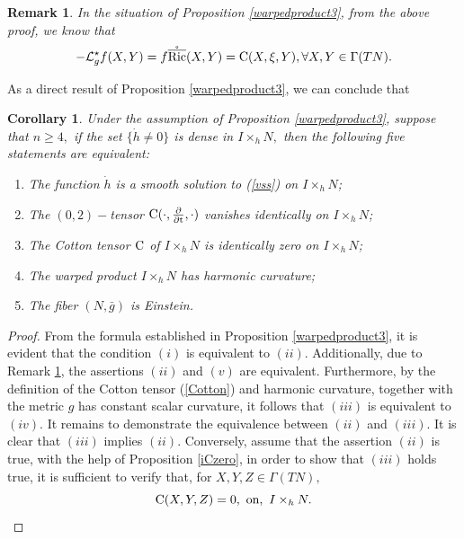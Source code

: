 \documentclass[10pt,leqno,oneside]{amsart}
\newtheorem{Cor}{Corollary}
\newtheorem{Rmk}{Remark}
\begin{document}
{    \begin{Rmk}\label{CXYN}
         In the situation of Proposition {\rm\ref{warpedproduct3}}, from the above proof, we know that
         \[-\mathcal{L}_g^{\star}f(X,Y)=f\mathring{\overline{{\rm{Ric}}}}(X,Y)={\rm{C}}(X,\xi,Y), \forall X,Y\in\Gamma(TN ).\]
    \end{Rmk}

         As a direct result of Proposition \ref{warpedproduct3}, we can conclude that

    \begin{Cor} \label{WPVSS}
         Under the assumption of Proposition {\rm\ref{warpedproduct3}}, suppose that $n\geq4,$ if the set $\{\dot{h}\neq0\}$ is dense in $I\times_hN,$ then the following five statements are equivalent:
        \begin{enumerate}[leftmargin=0.5cm, itemindent=0.4cm]
          \item[(i).] The function $\dot{h}$ is a smooth solution to {\rm(\ref{vss})} on $I\times_hN $;
          \item[(ii).] The $(0,2)-$tensor $\rm{C}(\cdot,\frac{\partial}{\partial t},\cdot)$ vanishes identically on $I\times_hN $;
          \item[(iii).] The Cotton tensor $\rm{C}$ of $I\times_hN $ is identically zero on $I\times_hN $;
          \item[(iv).] The warped product $I\times_hN $ has harmonic curvature;
          \item[(v).] The fiber $(N, \bar{g})$ is Einstein.
        \end{enumerate}
    \end{Cor}
    \begin{proof}
          From the formula established in Proposition \ref{warpedproduct3}, it is evident that the condition $(i)$ is equivalent to $(ii).$ Additionally, due to Remark \ref{CXYN}, the assertions $(ii)$ and $(v)$ are equivalent. Furthermore, by the definition of the Cotton tensor (\ref{Cotton}) and harmonic curvature, together with the metric $g$ has constant scalar curvature, it follows that $(iii)$ is equivalent to $(iv).$ It remains to demonstrate the equivalence between $(ii)$ and $(iii).$ It is clear that $(iii)$ implies $(ii).$ Conversely, assume that the assertion $(ii)$ is true, with the help of Proposition \ref{iCzero}, in order to show that $(iii)$ holds true, it is sufficient to verify that, for $X,Y,Z\in \Gamma(TN ),$
          \begin{equation}\label{CXYZ}
            {\rm{C}}(X,Y,Z)=0,~\text{on},~I\times_hN .

\end{equation}
\end{proof}}
\end{document}
